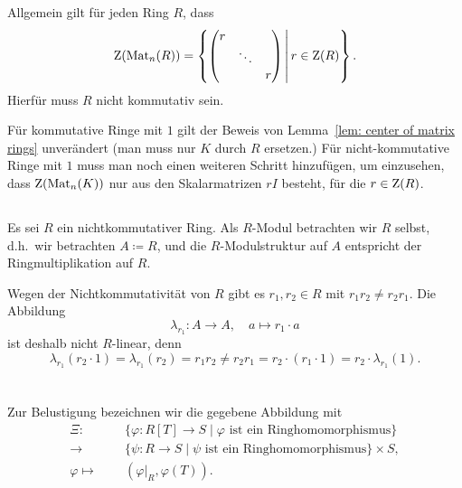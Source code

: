 \documentclass[a4paper, 10pt, numbers=noenddot]{scrartcl}
\begin{document}
\begin{remark}
  Allgemein gilt für jeden Ring $R$, dass
  \[
      \operatorname{Z}(\operatorname{Mat}_n(R))
    = \left\{
          \begin{pmatrix}
            r &         &   \\
              & \ddots  &   \\
              &         & r
          \end{pmatrix}
        \,
        \middle|
        \,
          r \in \operatorname{Z}(R)
      \right\}.
  \]
  Hierfür muss $R$ nicht kommutativ sein.
  
  Für kommutative Ringe mit $1$ gilt der Beweis von Lemma~\ref{lem: center of matrix rings} unverändert (man muss nur $K$ durch $R$ ersetzen.)
  Für nicht-kommutative Ringe mit $1$ muss man noch einen weiteren Schritt hinzufügen, um einzusehen, dass $\operatorname{Z}(\operatorname{Mat}_n(K))$ nur aus den Skalarmatrizen $r I$ besteht, für die $r \in \operatorname{Z}(R)$.
\end{remark}





\subsection{}

Es sei $R$ ein nichtkommutativer Ring.
Als $R$-Modul betrachten wir $R$ selbst, d.h.\ wir betrachten $A \coloneqq R$, und die $R$-Modulstruktur auf $A$ entspricht der Ringmultiplikation auf $R$.

Wegen der Nichtkommutativität von $R$ gibt es $r_1, r_2 \in R$ mit $r_1 r_2 \neq r_2 r_1$.
Die Abbildung
\[
  \lambda_{r_1} \colon A \to A,
  \quad
  a \mapsto r_1 \cdot a
\]
ist deshalb nicht $R$-linear, denn
\[
        \lambda_{r_1}(r_2 \cdot 1)
  =     \lambda_{r_1}(r_2)
  =     r_1 r_2
  \neq  r_2 r_1
  =     r_2 \cdot (r_1 \cdot 1)
  =     r_2 \cdot \lambda_{r_1}(1).
\]










\section{}

Zur Belustigung bezeichnen wir die gegebene Abbildung mit
\begin{align*}
              \Xi \colon
  \phantom{\varphi \mapsto}&\,  \{ \varphi  \colon R[T] \to S \mid \text{$\varphi$ ist ein Ringhomomorphismus} \}
  \\
                        \to&\,  \{ \psi \colon R \to S \mid \text{$\psi$ ist ein Ringhomomorphismus} \} \times S,
  \\
            \varphi \mapsto&\,  (\varphi|_R, \varphi(T)).
\end{align*}
\end{document}
